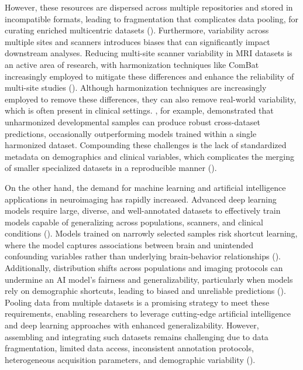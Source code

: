 However, these resources are dispersed across multiple repositories and stored in incompatible formats, 
leading to fragmentation that complicates data pooling, for curating enriched multicentric datasets (\cite{dishner2024survey}). 
Furthermore, variability across multiple sites and scanners introduces biases that can significantly 
impact downstream analyses. 
Reducing multi-site scanner variability in MRI datasets is an active area of research, 
with harmonization techniques like ComBat increasingly employed to mitigate these differences 
and enhance the reliability of multi-site studies (\cite{fortin2017harmonization, fortin2018harmonization}).
Although harmonization techniques are increasingly employed to remove these differences, 
they can also remove real-world variability, which is often present in clinical settings. 
\cite{adkinson2024brain}, for example, demonstrated that unharmonized developmental samples 
can produce robust cross-dataset predictions, occasionally outperforming models trained 
within a single harmonized dataset. 
Compounding these challenges is the lack of standardized metadata on demographics and clinical variables, 
which complicates the merging of smaller specialized datasets in a reproducible manner (\cite{pomponio2019harmonization}).

On the other hand, the demand for machine learning and artificial intelligence applications in neuroimaging has rapidly increased. 
Advanced deep learning models require large, diverse, and well-annotated datasets to effectively train models capable of generalizing across populations, 
scanners, and clinical conditions (\cite{dishner2024survey}). 
Models trained on narrowly selected samples risk shortcut learning, 
where the model captures associations between brain and unintended confounding 
variables rather than underlying brain-behavior relationships (\cite{marek2024replicability, yang2024limits}). 
Additionally, distribution shifts across populations and imaging protocols can undermine an AI model's 
fairness and generalizability, particularly when models rely on demographic shortcuts, 
leading to biased and unreliable predictions (\cite{yang2024limits}). 
Pooling data from multiple datasets is a promising strategy to meet these requirements, 
enabling researchers to leverage cutting-edge artificial intelligence and deep learning approaches with enhanced generalizability.
However, assembling and integrating such datasets remains challenging due to data fragmentation, 
limited data access, inconsistent annotation protocols, heterogeneous acquisition parameters, 
and demographic variability (\cite{goldfarb2022ai, pomponio2019harmonization}).

